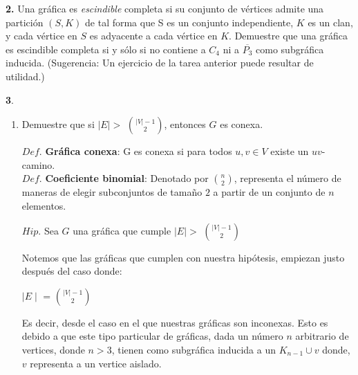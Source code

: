 \documentclass[12pt]{article}
\begin{document}
\vspace{1cm}

%
%
\textbf{2.} Una gráfica es \textit{escindible} completa si su conjunto de vértices admite una partición $(S, K)$
de tal forma que S es un conjunto independiente, $K$ es un clan, y cada vértice en $S$ es
adyacente a cada vértice en $K$. Demuestre que una gráfica es escindible completa si y
sólo si no contiene a $C_4$ ni a $\overline{P_3}$ como subgráfica inducida. (Sugerencia: Un ejercicio de
la tarea anterior puede resultar de utilidad.)
\vspace{1cm}

%
%
\textbf{3}.

\begin{enumerate}[label=\alph*)]

    \item Demuestre que si $\mid E \mid >$ \( \binom{|V|-1}{2} \), entonces $G$ es conexa.
    \begin{tcolorbox}[title=\textbf{Definiciones}, colback=blue!15!white, colframe=black!]
        $Def.$ \textbf{Gráfica conexa}: G es conexa si para todos $u, v \in V$  existe un $uv$-camino.\\

        $Def.$ \textbf{Coeficiente binomial}: Denotado por \( \binom{n}{2} \), representa el número de maneras 
        de elegir subconjuntos de tamaño $2$ a partir de un conjunto de $n$ elementos.
    
    \end{tcolorbox}
    \begin{tcolorbox}[title=\textbf{Hipotesis}, colback=red!15!white, colframe=black!]
        $Hip.$ Sea $G$ una gráfica que cumple $\mid E \mid >$ \( \binom{|V|-1}{2} \)

    \end{tcolorbox}

    Notemos que las gráficas que cumplen con nuestra hipótesis, empiezan justo después del caso donde:

    \begin{center}
        $\mid E \mid$ = \( \binom{|V|-1}{2} \)
    \end{center}

    Es decir, desde el caso en el que nuestras gráficas son inconexas. Esto es debido a que este tipo particular de 
    gráficas, dada un número $n$ arbitrario de vertices, donde $n > 3$, tienen como subgráfica inducida a un $K_{n-1} \cup v$ 
    donde, $v$ representa a un vertice aislado.\\


\end{enumerate}
\end{document}
